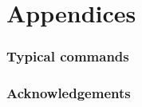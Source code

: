 \documentclass[preprint,12pt]{elsarticle}
\begin{document}
\cleardoublepage

\part{Appendices}
\appendix

\section{Typical  commands}
\label{app:agilerunmc}


\section{Acknowledgements}
\label{app:acknowledgements}



\cleardoublepage



\end{document}
